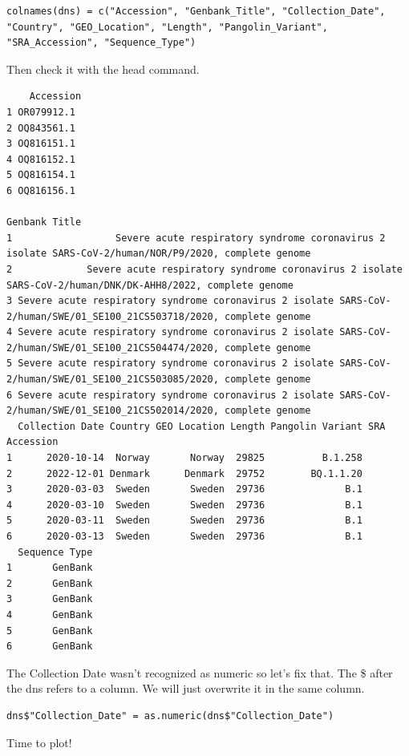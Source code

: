\documentclass[
]{book}
\begin{document}
\begin{verbatim}
colnames(dns) = c("Accession", "Genbank_Title", "Collection_Date", "Country", "GEO_Location", "Length", "Pangolin_Variant", "SRA_Accession", "Sequence_Type")
\end{verbatim}

Then check it with the head command.

\begin{verbatim}
    Accession
1 OR079912.1
2 OQ843561.1
3 OQ816151.1
4 OQ816152.1
5 OQ816154.1
6 OQ816156.1
                                                                                                           Genbank Title
1                  Severe acute respiratory syndrome coronavirus 2 isolate SARS-CoV-2/human/NOR/P9/2020, complete genome
2             Severe acute respiratory syndrome coronavirus 2 isolate SARS-CoV-2/human/DNK/DK-AHH8/2022, complete genome
3 Severe acute respiratory syndrome coronavirus 2 isolate SARS-CoV-2/human/SWE/01_SE100_21CS503718/2020, complete genome
4 Severe acute respiratory syndrome coronavirus 2 isolate SARS-CoV-2/human/SWE/01_SE100_21CS504474/2020, complete genome
5 Severe acute respiratory syndrome coronavirus 2 isolate SARS-CoV-2/human/SWE/01_SE100_21CS503085/2020, complete genome
6 Severe acute respiratory syndrome coronavirus 2 isolate SARS-CoV-2/human/SWE/01_SE100_21CS502014/2020, complete genome
  Collection Date Country GEO Location Length Pangolin Variant SRA Accession
1      2020-10-14  Norway       Norway  29825          B.1.258
2      2022-12-01 Denmark      Denmark  29752        BQ.1.1.20
3      2020-03-03  Sweden       Sweden  29736              B.1
4      2020-03-10  Sweden       Sweden  29736              B.1
5      2020-03-11  Sweden       Sweden  29736              B.1
6      2020-03-13  Sweden       Sweden  29736              B.1
  Sequence Type
1       GenBank
2       GenBank
3       GenBank
4       GenBank
5       GenBank
6       GenBank
\end{verbatim}

\hfill\break

The Collection Date wasn't recognized as numeric so let's fix that. The \$ after the dns refers to a column. We will just overwrite it in the same column.

\begin{verbatim}
dns$"Collection_Date" = as.numeric(dns$"Collection_Date")
\end{verbatim}

Time to plot!
\end{document}
